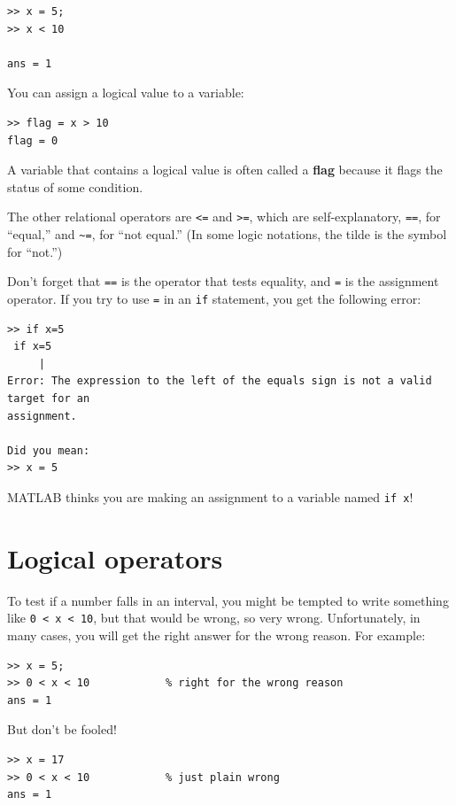 \documentclass[
]{book}
\begin{document}
\begin{verbatim}
>> x = 5;
>> x < 10

ans = 1
\end{verbatim}

You can assign a logical value to a variable:

\begin{verbatim}
>> flag = x > 10
flag = 0
\end{verbatim}

A variable that contains a logical value is often called a {\bf flag}
because it flags the status of some condition.

The other relational operators are {\tt <=} and {\tt >=}, which are
self-explanatory, {\tt ==}, for ``equal,'' and
\verb+~=+, for ``not equal.''  (In some logic notations, the tilde
is the symbol for ``not.'')

Don't forget that {\tt ==} is the operator that tests equality,
and {\tt =} is the assignment operator.  If you try to use {\tt =} in
an {\tt if} statement, you get the following error:

\begin{verbatim}
>> if x=5
 if x=5
     |
Error: The expression to the left of the equals sign is not a valid target for an 
assignment.
 
Did you mean:
>> x = 5
\end{verbatim}

MATLAB thinks you are making an assignment to a variable named {\tt if x}!


\section{Logical operators}
\label{sect:logop}

To test if a number falls in an interval, you might be
tempted to write something like {\tt 0 < x < 10}, but that
would be wrong, so very wrong.  Unfortunately, in many cases,
you will get the right answer for the wrong reason.  For
example:

\begin{verbatim}
>> x = 5;
>> 0 < x < 10            % right for the wrong reason
ans = 1
\end{verbatim}

But don't be fooled!

\begin{verbatim}
>> x = 17
>> 0 < x < 10            % just plain wrong
ans = 1
\end{verbatim}
\end{document}
